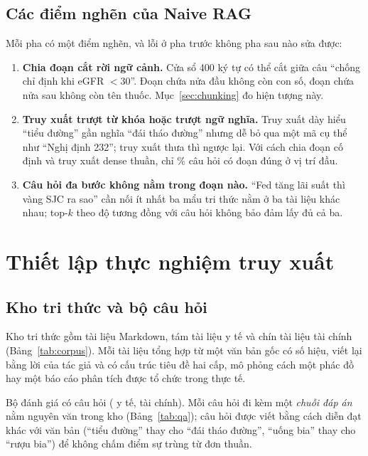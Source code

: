 
\subsection{Các điểm nghẽn của Naive RAG}
Mỗi pha có một điểm nghẽn, và lỗi ở pha trước không pha sau nào sửa được:

\begin{enumerate}
  \item \textbf{Chia đoạn cắt rời ngữ cảnh.} Cửa sổ 400 ký tự có thể cắt giữa câu ``chống chỉ định khi eGFR
        $< 30$''. Đoạn chứa nửa đầu không còn con số, đoạn chứa nửa sau không còn tên thuốc. Mục~\ref{sec:chunking}
        đo hiện tượng này.
  \item \textbf{Truy xuất trượt từ khóa hoặc trượt ngữ nghĩa.} Truy xuất dày hiểu ``tiểu đường'' gần nghĩa ``đái
        tháo đường'' nhưng dễ bỏ qua một mã cụ thể như ``Nghị định 232''; truy xuất thưa thì ngược lại. Với cách
        chia đoạn cố định và truy xuất dense thuần, chỉ \% câu hỏi có đoạn đúng ở vị trí
        đầu.
  \item \textbf{Câu hỏi đa bước không nằm trong đoạn nào.} ``Fed tăng lãi suất thì vàng SJC ra sao'' cần nối ít
        nhất ba mẩu tri thức nằm ở ba tài liệu khác nhau; top-$k$ theo độ tương đồng với câu hỏi không bảo đảm lấy
        đủ cả ba.
\end{enumerate}

\section{Thiết lập thực nghiệm truy xuất}\label{sec:thietlap}
\subsection{Kho tri thức và bộ câu hỏi}
Kho tri thức gồm  tài liệu Markdown, tám tài liệu y tế và chín tài liệu tài chính
(Bảng~\ref{tab:corpus}). Mỗi tài liệu tổng hợp từ một văn bản gốc có số hiệu, viết lại bằng lời của tác giả và có
cấu trúc tiêu đề hai cấp, mô phỏng cách một phác đồ hay một báo cáo phân tích được tổ chức trong thực tế.


Bộ đánh giá có  câu hỏi ( y tế,  tài chính).
Mỗi câu hỏi đi kèm một \emph{chuỗi đáp án} nằm nguyên văn trong kho (Bảng~\ref{tab:qa}); câu hỏi được viết bằng
cách diễn đạt khác với văn bản (``tiểu đường'' thay cho ``đái tháo đường'', ``uống bia'' thay cho ``rượu bia'') để
không chấm điểm sự trùng từ đơn thuần.

